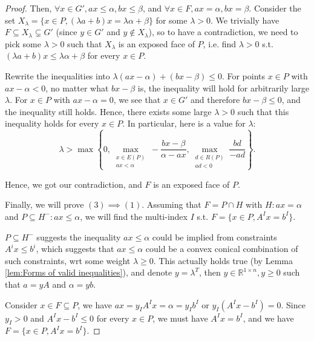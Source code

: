 \begin{proof}
  Then, \( \forall x \in G', ax \le \alpha, bx \le \beta \), and \( \forall x
  \in F, ax = \alpha, bx = \beta \). Consider the
  set \(
  X_{\lambda} = \{x \in P, (\lambda a + b)x = \lambda \alpha + \beta\}  \) for
  some \(  \lambda > 0 \). We trivially have \( F \subseteq X_{\lambda}
  \subsetneq G' \) (since \( y \in G' \) and \( y \notin X_{\lambda} \)), so to
  have a contradiction, we need to pick some \( \lambda > 0 \) such that \(
  X_{\lambda} \) is an exposed face of \( P \), i.e. find \( \lambda > 0 \) s.t.
  \( (\lambda a + b)x \le \lambda\alpha + \beta \) for every \( x \in P \).

  Rewrite the inequalities into \( \lambda(ax
  -\alpha) + (bx - \beta) \le  0 \). For points \( x \in P \) with \( ax -
  \alpha < 0
  \), no matter what \( bx - \beta \) is, the inequality will hold for
  arbitrarily large \( \lambda \). For \( x \in P \) with \( ax - \alpha =0 \),
  we see that \( x \in G' \) and therefore \( bx - \beta \le  0 \), and the
  inequality still holds. Hence, there exists some large \( \lambda > 0 \) such
  that this inequality holds for every \( x \in P \). In particular, here is a
  value for \( \lambda \):
  \[
    \lambda > \max \left\{ 0, \max_{\substack{x\in E(P)\\ax<\alpha}} -\frac{bx
    - \beta}{\alpha - ax}, \max_{\substack{d \in R(P)\\ ad < 0}}
  \frac{bd}{-ad}\right\}
  .\]

  Hence, we got our contradiction, and \( F \) is an exposed face of \( P \).

  Finally, we will prove \( (3) \implies (1) \). Assuming that \( F = P \cap H
  \) with \( H: ax = \alpha \) and \( P \subseteq H^{-}: ax \le
  \alpha\), we will find the multi-index \( I \) s.t. \( F = \{x \in P, A^{I}x =
  b^{I}\}\).

  \( P \subseteq H^{-} \) suggests the inequality \( ax \le \alpha \) could be
  implied from constraints \( A^{i}x \le  b^{i} \), which suggests that \( ax
  \le \alpha \) could be a convex conical combination of such constraints, wrt some
  weight \( \lambda \ge 0 \). This
  actually holds true (by Lemma \ref{lem:Forms of valid inequalities}), and denote
  \( y = \lambda^{T} \), then \( y \in \mathbb{R}^{1\times n}, y \ge 0 \) such
  that \( a = yA \)  and \( \alpha = yb \).

  Consider \( x \in F \subseteq P \), we have \( ax = y_{I}A^{I}x = \alpha =
  y_{I}b^{I} \) or \( y_{I}(A^{I}x - b^{I}) = 0 \). Since \( y_{I} > 0 \) and \(
  A^{I}x - b^{I} \le 0\) for every \( x \in P \), we must have \( A^{I}x = b^{I}
  \), and we have \( F = \{x \in P, A^{I}x = b^{I}\}   \).
\end{proof}

